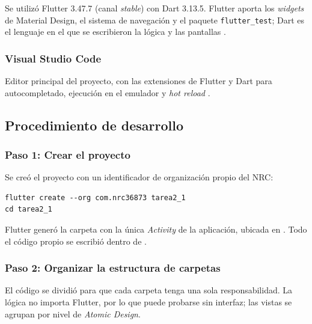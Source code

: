 \documentclass[12pt,a4paper]{article}
\begin{document}
Se utilizó Flutter 3.47.7 (canal \textit{stable}) con Dart 3.13.5. Flutter aporta los \textit{widgets} de Material Design, el sistema de navegación y el paquete \texttt{flutter\_test}; Dart es el lenguaje en el que se escribieron la lógica y las pantallas \citep{flutterdocs, dartdocs}.

\subsubsection{Visual Studio Code}

Editor principal del proyecto, con las extensiones de Flutter y Dart para autocompletado, ejecución en el emulador y \textit{hot reload} \citep{vscode}.

\subsection{Procedimiento de desarrollo}

\subsubsection*{Paso 1: Crear el proyecto}

Se creó el proyecto con un identificador de organización propio del NRC:

\begin{lstlisting}
flutter create --org com.nrc36873 tarea2_1
cd tarea2_1
\end{lstlisting}

Flutter generó la carpeta  con la única \textit{Activity} de la aplicación, ubicada en . Todo el código propio se escribió dentro de .

\subsubsection*{Paso 2: Organizar la estructura de carpetas}

El código se dividió para que cada carpeta tenga una sola responsabilidad. La lógica no importa Flutter, por lo que puede probarse sin interfaz; las vistas se agrupan por nivel de \textit{Atomic Design}.
\end{document}
